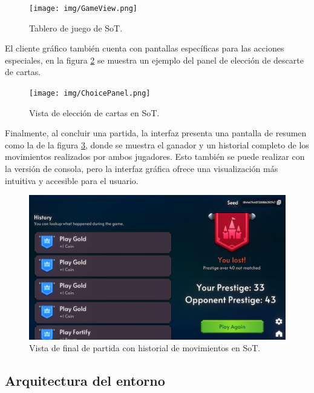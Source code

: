 \begin{figure}[H]
	\centering
	\texttt{[image: img/GameView.png]}
	\caption{Tablero de juego de SoT. \cite{ematerasu_scriptsoftribute-gui-20_2025}}
	\label{fig:game_view}
\end{figure}

El cliente gráfico también cuenta con pantallas específicas para las acciones especiales, en la figura \ref{fig:choice_panel} se muestra un ejemplo del panel de elección de descarte de cartas.

\begin{figure}[H]
	\centering
	\texttt{[image: img/ChoicePanel.png]}
	\caption{Vista de elección de cartas en SoT. \cite{ematerasu_scriptsoftribute-gui-20_2025}}
	\label{fig:choice_panel}
\end{figure}

Finalmente, al concluir una partida, la interfaz presenta una pantalla de resumen como la de la figura \ref{fig:game_end}, donde se muestra el ganador y un historial completo de los movimientos realizados por ambos jugadores. Esto también se puede realizar con la versión de consola, pero la interfaz gráfica ofrece una visualización más intuitiva y accesible para el usuario.

\begin{figure}[H]
	\centering
	\includegraphics[width=1.0\textwidth]{img/GameEnd.png}
	\caption{Vista de final de partida con historial de movimientos en SoT. \cite{ematerasu_scriptsoftribute-gui-20_2025}}
	\label{fig:game_end}
\end{figure}

\subsection{Arquitectura del entorno} \label{sec:arquitectura_entorno}

